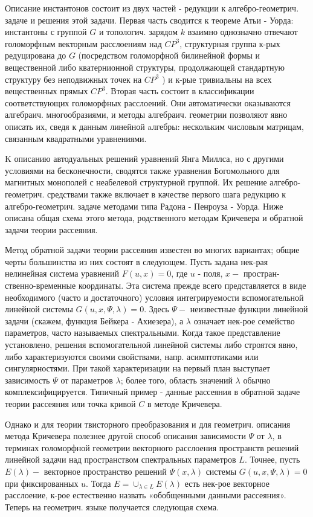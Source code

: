 \documentclass[10pt]{article}
\begin{document}
Описание инстантонов состоит из двух частей - редукции к алгебро-геометрич. задаче и решения этой задачи. Первая часть сводится к теореме Атьи - Уорда: инстантоны с группой $G$ и топологич. зарядом $k$ взаимно однозначно отвечают голоморфным векторным расслоениям над $C P^{3}$, структурная группа к-рых редуцирована до $G$ (посредством голоморфной билинейной формы и вещественной либо кватернионной структуры, продолжающей стандартную структуру без неподвижных точек на $C P^{3}$ ) и к-рые тривиальны на всех вещественных прямых $C P^{3}$. Вторая часть состоит в классификации соответствующих голоморфных расслоений. Они автоматически оказываются алгебраич. многообразиями, и методы алгебраич. геометрии позволяют явно описать их, сведя к данным линейной aлгебры: нескольким числовым матрицам, связанным квадратными уравнениями.



K описанию автодуальных решений уравнений Янга Миллса, но с другими условиями на бесконечности, сводятся также уравнения Богомольного для магнитных монополей с неабелевой структурной группой. Их решение алгебро-геометрич. средствами также включает в качестве первого шага редукцию к алгебро-геометрич. задаче методами типа Радона - Пенроуза - Уорда. Ниже описана общая схема этого метода, родственного методам Кричевера и обратной задачи теории рассеяния.



Метод обратной задачи теории рассеяния известен во многих вариантах; общие черты большинства из них состоят в следующем. Пусть задана нек-рая нелинейная система уравнений $F(u, x)=0$, где $u$ - поля, $x-$ простран- ственно-временные координаты. Эта система прежде всего представляется в виде необходимого (часто и достаточного) условия интегрируемости вспомогательной линейной системы $G(u, x, \Psi, \lambda)=0$. Здесь $\Psi-$ неизвестные функции линейной задачи (скажем, функция Бейкера - Ахиезера), а $\lambda$ означает нек-рое семейство параметров, часто называемых спектральными. Когда такое представление установлено, решения вспомогательной линейной системы либо строятся явно, либо характеризуются своими свойствами, напр. асимптотиками или сингулярностями. При такой характеризации на первый план выступает зависимость $\Psi$ от параметров $\lambda$; более того, область значений $\lambda$ обычно комплексифицируется. Типичный пример - данные рассеяния в обратной задаче теории рассеяния или точка кривой $C$ в методе Кричевера.



Однако и для теории твисторного преобразования и для геометрич. описания метода Кричевера полезнее другой способ описания зависимости $\Psi$ от $\lambda$, в терминах голоморфной геометрии векторного расслоения пространств решений линейной задачи над пространством спектральных параметров $L$. Точнее, пусть $E(\lambda)-$ векторное пространство решений $\Psi(x, \lambda)$ системы $G(u, x, \Psi, \lambda)=0$ при фиксированных $u$. Тогда $E=\cup_{\lambda \in L} E(\lambda)$ есть нек-рое векторное расслоение, к-рое естественно назвать «обобщенными данными рассеяния». Теперь на геометрич. языке получается следующая схема.
\end{document}
